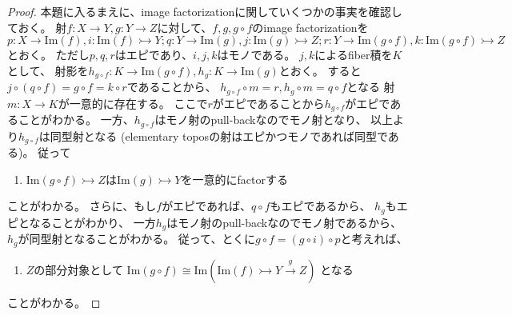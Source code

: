\documentclass[uplatex]{jsarticle}
\theoremstyle{definition}
\newcommand{\rtot}{\rightarrowtail}
\newcommand{\im}{\mathrm{Im}}
\begin{document}
\begin{proof}
  本題に入るまえに、image factorizationに関していくつかの事実を確認しておく。
  射\(f:X\to Y, g:Y\to Z\)に対して、\(f,g,g\circ f\)のimage factorizationを
  \(p:X\to \im(f), i:\im(f) \rtot Y;
  q:Y\to \im(g), j:\im(g) \rtot Z;
  r:Y\to \im(g\circ f), k:\im(g\circ f) \rtot Z\)とおく。
  ただし\(p,q,r\)はエピであり、\(i,j,k\)はモノである。
  \(j,k\)によるfiber積を\(K\)として、
  射影を\(h_{g\circ f}:K\to \im(g\circ f), h_g:K\to \im(g)\)とおく。
  すると\(j\circ (q\circ f) = g\circ f = k\circ r\)であることから、
  \(h_{g\circ f}\circ m = r , h_g \circ m = q\circ f\)となる
  射\(m:X\to K\)が一意的に存在する。
  ここで\(r\)がエピであることから\(h_{g\circ f}\)がエピであることがわかる。
  一方、\(h_{g\circ f}\)はモノ射のpull-backなのでモノ射となり、
  以上より\(h_{g\circ f}\)は同型射となる (elementary toposの射はエピかつモノであれば同型である)。
  従って
  \begin{enumerate}[label=(\fnsymbol*),start=2]
    \item \label{enumi: prob: 1.10 proof 1}
    \(\im(g\circ f)\rtot Z\)は\(\im(g)\rtot Y\)を一意的にfactorする
  \end{enumerate}
  ことがわかる。
  さらに、もし\(f\)がエピであれば、\(q\circ f\)もエピであるから、
  \(h_g\)もエピとなることがわかり、
  一方\(h_g\)はモノ射のpull-backなのでモノ射であるから、
  \(h_g\)が同型射となることがわかる。
  従って、とくに\(g\circ f = (g\circ i) \circ p\)と考えれば、
  \begin{enumerate}[label=(\fnsymbol*),start=3]
    \item \label{enumi: prob: 1.10 proof 2}
    \(Z\)の部分対象として
    \(\im(g\circ f) \cong \im(\im(f)\rtot Y\xrightarrow{g} Z)\)
    となる
  \end{enumerate}
  ことがわかる。


\end{proof}
\end{document}
